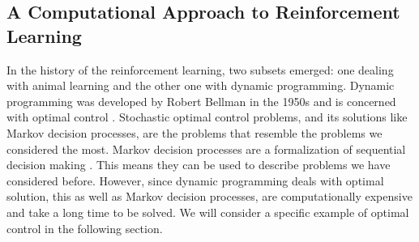 \subsection{A Computational Approach to Reinforcement Learning}
In the history of the reinforcement learning, two subsets emerged: one dealing with animal learning and the other one with dynamic programming. %
Dynamic programming \citep{bellman1960dynamic} was developed by Robert Bellman in the 1950s and is concerned with optimal control \citep{sutton2018reinforcement}. 
Stochastic optimal control problems, and its solutions like Markov decision processes, are the problems that resemble the problems we considered the most. %
Markov decision processes are a formalization of sequential decision making \citep{sutton2018reinforcement}. This means they can be used to describe problems we have considered before.  
However, since dynamic programming deals with optimal solution, this as well as Markov decision processes, are computationally expensive and take a long time to be solved. We will consider a specific example of optimal control in the following section. 

